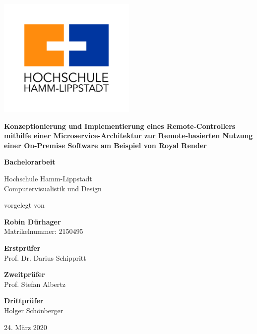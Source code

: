 \begin{titlepage}
    \begin{center}
    
    \includegraphics[width=0.5\textwidth]{res/img/hshl_logo.jpg}
    
    \Large
    \textbf{Konzeptionierung und Implementierung eines Remote-Controllers mithilfe einer Microservice-Architektur zur Remote-basierten Nutzung einer On-Premise Software am Beispiel von Royal Render}
    \vspace{0.4cm}
    
    \large
    \textbf{Bachelorarbeit}
    
    Hochschule Hamm-Lippstadt\\
    Computervisualistik und Design

    vorgelegt von
    \vspace{0.1cm}
    
    \textbf{Robin Dürhager}\\
    Matrikelnummer: 2150495
    \vspace{0.3cm}
    
    \textbf{Erstprüfer}\\
    Prof. Dr. Darius Schippritt
    \vspace{0.3cm}
    
    \textbf{Zweitprüfer}\\
    Prof. Stefan Albertz
    \vspace{0.3cm}

    \textbf{Drittprüfer}\\
    Holger Schönberger
    \vspace{0.3cm}
    
    24. März 2020

    \end{center}
    \end{titlepage}

    \newpage
    \cleardoublepage